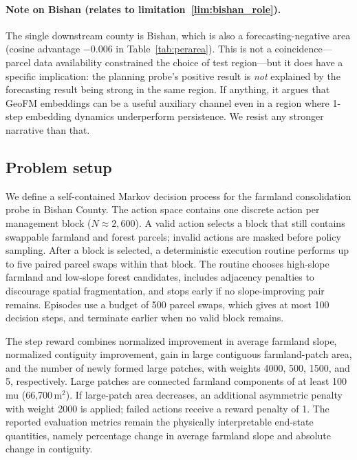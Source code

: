 \documentclass{article}
\begin{document}
\paragraph{Note on Bishan (relates to limitation~\ref{lim:bishan_role}).}
\label{sec:planning_bishan_note}
The single downstream county is Bishan, which is also a forecasting-negative area (cosine advantage $-0.006$ in Table~\ref{tab:perarea}). This is not a coincidence---parcel data availability constrained the choice of test region---but it does have a specific implication: the planning probe's positive result is \emph{not} explained by the forecasting result being strong in the same region. If anything, it argues that GeoFM embeddings can be a useful auxiliary channel even in a region where 1-step embedding dynamics underperform persistence. We resist any stronger narrative than that.

\subsection{Problem setup}

We define a self-contained Markov decision process for the farmland consolidation probe in Bishan County. The action space contains one discrete action per management block ($N \approx 2{,}600$). A valid action selects a block that still contains swappable farmland and forest parcels; invalid actions are masked before policy sampling. After a block is selected, a deterministic execution routine performs up to five paired parcel swaps within that block. The routine chooses high-slope farmland and low-slope forest candidates, includes adjacency penalties to discourage spatial fragmentation, and stops early if no slope-improving pair remains. Episodes use a budget of 500 parcel swaps, which gives at most 100 decision steps, and terminate earlier when no valid block remains.

The step reward combines normalized improvement in average farmland slope, normalized contiguity improvement, gain in large contiguous farmland-patch area, and the number of newly formed large patches, with weights 4000, 500, 1500, and 5, respectively. Large patches are connected farmland components of at least 100 mu (66{,}700\,m$^2$). If large-patch area decreases, an additional asymmetric penalty with weight 2000 is applied; failed actions receive a reward penalty of 1. The reported evaluation metrics remain the physically interpretable end-state quantities, namely percentage change in average farmland slope and absolute change in contiguity.
\end{document}
